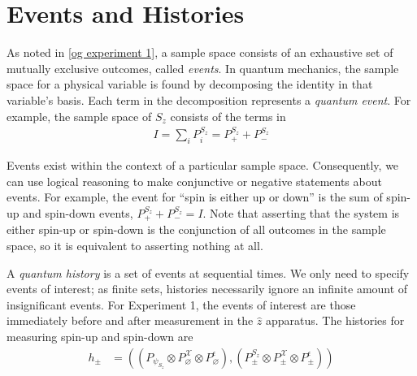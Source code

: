 \section{Events and Histories} \label{events}

%

As noted in \autoref{og experiment 1}, a sample space consists of an exhaustive set of mutually exclusive outcomes, called \textit{events}. In quantum mechanics, the sample space for a physical variable is found by decomposing the identity in that variable's basis. Each term in the decomposition represents a \textit{quantum event}. For example, the sample space of $S_z$ consists of the terms in
\begin{align}
  I = \sum_i P^{S_z}_i = P^{S_z}_+ + P^{S_z}_-
\end{align}

Events exist within the context of a particular sample space. Consequently, we can use logical reasoning to make conjunctive or negative statements about events. For example, the event for ``spin is either up or down'' is the sum of spin-up and spin-down events, $P^{S_z}_+ + P^{S_z}_- = I$. Note that asserting that the system is either spin-up or spin-down is the conjunction of all outcomes in the sample space, so it is equivalent to asserting nothing at all.

A \textit{quantum history} is a set of events at sequential times. We only need to specify events of interest; as finite sets, histories necessarily ignore an infinite amount of insignificant events. For Experiment 1, the events of interest are those immediately before and after measurement in the $\hat{z}$ apparatus. The histories for measuring spin-up and spin-down are
\begin{align}
  h_\pm &= \left( \left(P_{\psi_{S_z}} \otimes P^\mathcal{X}_\varnothing \otimes P^\epsilon_\varnothing \right), \left(P^{S_z}_\pm \otimes P^\mathcal{X}_\pm \otimes P^\epsilon_\pm \right)  \right)
\end{align}

